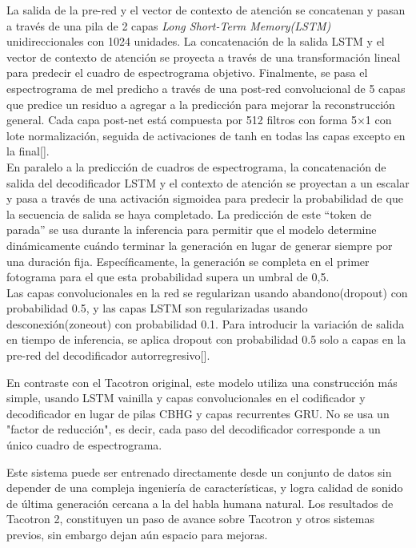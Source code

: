 La salida de la pre-red y el vector de contexto de atención se concatenan y pasan a través de una pila de 2 capas \textit{Long Short-Term Memory(LSTM)} unidireccionales con 1024 unidades. La concatenación de la salida LSTM y el vector de contexto de atención se proyecta a través de una transformación lineal para predecir el cuadro de espectrograma objetivo. Finalmente, se pasa el espectrograma de mel predicho a través de una post-red convolucional de 5 capas que predice un residuo a agregar a la predicción para mejorar la reconstrucción general. Cada capa post-net está compuesta por 512 filtros con forma 5×1 con lote normalización, seguida de activaciones de tanh en todas las capas excepto en la final[\cite{shen2018natural}].\\


En paralelo a la predicción de cuadros de espectrograma, la concatenación de
salida del decodificador LSTM y el contexto de atención se proyectan a un escalar y pasa a través de una activación sigmoidea para predecir la probabilidad de que la secuencia de salida se haya completado. La predicción de este ``token de parada'' se usa durante la inferencia para permitir que el modelo determine dinámicamente cuándo terminar la generación en lugar de generar siempre por una duración fija. Específicamente, la generación se completa en el primer fotograma para el que esta probabilidad supera un umbral de 0,5.\\

Las capas convolucionales en la red se regularizan usando abandono(dropout) con probabilidad 0.5, y las capas LSTM son regularizadas usando desconexión(zoneout) con probabilidad 0.1. Para introducir la variación de salida en tiempo de inferencia, se aplica dropout con probabilidad 0.5 solo a capas en la pre-red del decodificador autorregresivo[\cite{shen2018natural}].


En contraste con el Tacotron original, este modelo utiliza una construcción más simple, usando LSTM vainilla y capas convolucionales en el codificador y decodificador en lugar de pilas CBHG y capas recurrentes GRU. No se usa un "factor de reducción", es decir, cada paso del decodificador corresponde a un único cuadro de espectrograma.

Este sistema puede ser entrenado directamente desde un conjunto de datos sin depender de una compleja ingeniería de características, y logra calidad de sonido de última generación cercana a la del habla humana natural. Los resultados de Tacotron 2, constituyen un paso de avance sobre Tacotron y otros sistemas previos, sin embargo dejan aún espacio para mejoras. 


